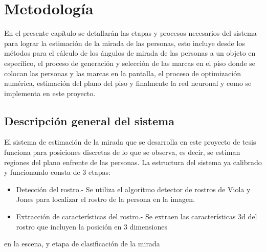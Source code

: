 \chapter{Metodología}

En el presente capítulo se detallarán las etapas y procesos necesarios del sistema para lograr la estimación de la mirada de las personas, esto incluye desde los métodos para el cálculo de los ángulos de mirada de las personas a un objeto en específico, el proceso de generación y selección de las marcas en el piso donde se colocan las personas y las marcas en la pantalla, el proceso de optimización numérica, estimación del plano del piso y finalmente la red neuronal y como se implementa en este proyecto.

 \section{Descripción general del sistema}
 El sistema de estimación de la mirada que se desarrolla en este proyecto de tesis funciona para posiciones discretas de lo que se observa, es decir, se estiman regiones del plano enfrente de las personas. La estructura del sistema ya calibrado y funcionando consta de 3 etapas: 
 \begin{itemize}
 	\item Detección del rostro.- Se utiliza el algoritmo detector de rostros de Viola y Jones para localizar el rostro de la persona en la imagen.
 	\item Extracción de características del rostro.- Se extraen las características 3d del rostro que incluyen la posición en 3 dimensiones 
 \end{itemize}
 en la escena, y etapa de clasificación de la mirada

